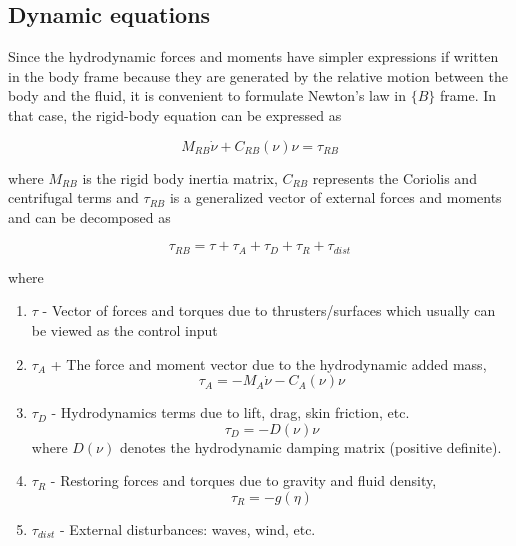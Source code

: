 \subsection{Dynamic equations}

Since the hydrodynamic forces and moments have simpler expressions if written in the body frame because they are generated by the relative motion between the body and the fluid, it is convenient to formulate Newton’s law in $\{B\}$ frame. In that case, the rigid-body equation can be expressed as

\begin{equation}
    M_{RB}\dot{\nu} + C_{RB}(\nu)\nu = \tau_{RB}
    \label{eq:rigid_body}
\end{equation}

where $M_{RB}$ is the rigid body inertia matrix, $C_{RB}$ represents the Coriolis and centrifugal terms and $\tau_{RB}$ is a generalized vector of external forces and moments and can be decomposed as
 
\begin{equation}
    \tau_{RB} = \tau + \tau_A + \tau_D + \tau_R + \tau_{dist}
    \label{eq:tau_rb}
\end{equation}

where
\begin{enumerate}
    \item $\tau$ - Vector of forces and torques due to thrusters/surfaces which usually can be viewed as the control input
    \item $\tau_A$ + The force and moment vector due to the hydrodynamic added mass,
    \begin{equation}
        \tau_A = - M_A \dot{\nu} - C_A(\nu)\nu
        \label{eq:tau_a}
    \end{equation}
    \item $\tau_D$ - Hydrodynamics terms due to lift, drag, skin friction, etc.
    \begin{equation}
        \tau_D = - D(\nu)\nu
        \label{eq:tau_d}
    \end{equation}
    where $D(\nu)$ denotes the hydrodynamic damping matrix (positive definite).
    \item $\tau_R$ - Restoring forces and torques due to gravity and fluid density,
    \begin{equation}
        \tau_R = -g(\eta)
        \label{eq:tau_r}
    \end{equation}
    \item $\tau_{dist}$ - External disturbances: waves, wind, etc.
\end{enumerate}

